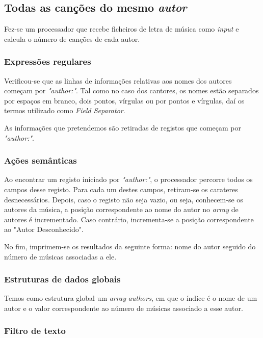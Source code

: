 \documentclass{article}
\begin{document}
\subsection{Todas as canções do mesmo \emph{autor}}

Fez-se um processador que recebe ficheiros de letra de música como \emph{input} e calcula o número de canções de cada autor.

\subsubsection{Expressões regulares}

Verificou-se que as linhas de informações relativas aos nomes dos autores começam por \emph{"author:"}. Tal como no caso dos cantores, os nomes estão separados por espaços em branco, dois pontos, vírgulas ou por pontos e vírgulas, daí os termos utilizado como \emph{Field Separator}.

As informações que pretendemos são retiradas de registos que começam por \emph{"author:"}.

\subsubsection{Ações semânticas}

Ao encontrar um registo iniciado por \emph{"author:"}, o processador percorre todos os campos desse registo. Para cada um destes campos, retiram-se os carateres desnecessários. Depois, caso o registo não seja vazio, ou seja, conhecem-se os autores da música, a posição correspondente ao nome do autor no \emph{array} de autores é incrementado. Caso contrário, incrementa-se a posição correspondente ao "Autor Desconhecido".

No fim, imprimem-se os resultados da seguinte forma: nome do autor seguido do número de músicas associadas a ele.

\subsubsection{Estruturas de dados globais}

Temos como estrutura global um \emph{array} \emph{authors}, em que o índice é o nome de um autor e o valor correspondente ao número de músicas associado a esse autor. 

\subsubsection{Filtro de texto}
\end{document}

